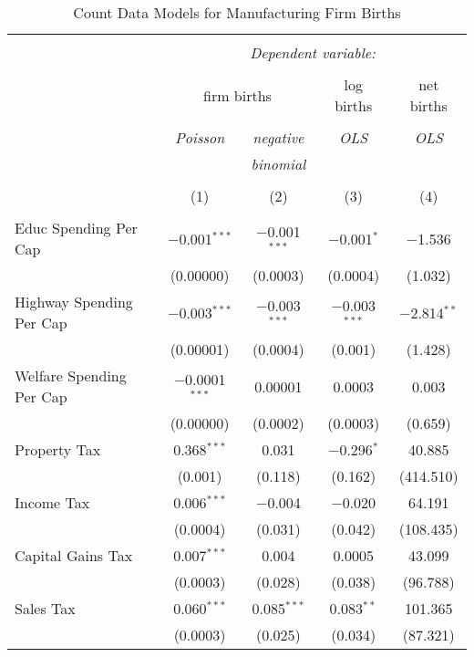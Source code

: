 
\begin{table}[!htbp] \centering 
  \caption{Count Data Models for Manufacturing Firm Births} 
  \label{} 
\begin{tabular}{@{\extracolsep{5pt}}lcccc} 
\\[-1.8ex]\hline 
\hline \\[-1.8ex] 
 & \multicolumn{4}{c}{\textit{Dependent variable:}} \\ 
\cline{2-5} 
\\[-1.8ex] & \multicolumn{2}{c}{firm births} & log births & net births \\ 
\\[-1.8ex] & \textit{Poisson} & \textit{negative} & \textit{OLS} & \textit{OLS} \\ 
 & \textit{} & \textit{binomial} & \textit{} & \textit{} \\ 
\\[-1.8ex] & (1) & (2) & (3) & (4)\\ 
\hline \\[-1.8ex] 
 Educ Spending Per Cap & $-$0.001$^{***}$ & $-$0.001$^{***}$ & $-$0.001$^{*}$ & $-$1.536 \\ 
  & (0.00000) & (0.0003) & (0.0004) & (1.032) \\ 
  Highway Spending Per Cap  & $-$0.003$^{***}$ & $-$0.003$^{***}$ & $-$0.003$^{***}$ & $-$2.814$^{**}$ \\ 
  & (0.00001) & (0.0004) & (0.001) & (1.428) \\ 
  Welfare Spending Per Cap  & $-$0.0001$^{***}$ & 0.00001 & 0.0003 & 0.003 \\ 
  & (0.00000) & (0.0002) & (0.0003) & (0.659) \\ 
  Property Tax & 0.368$^{***}$ & 0.031 & $-$0.296$^{*}$ & 40.885 \\ 
  & (0.001) & (0.118) & (0.162) & (414.510) \\ 
  Income Tax & 0.006$^{***}$ & $-$0.004 & $-$0.020 & 64.191 \\ 
  & (0.0004) & (0.031) & (0.042) & (108.435) \\ 
  Capital Gains Tax & 0.007$^{***}$ & 0.004 & 0.0005 & 43.099 \\ 
  & (0.0003) & (0.028) & (0.038) & (96.788) \\ 
  Sales Tax & 0.060$^{***}$ & 0.085$^{***}$ & 0.083$^{**}$ & 101.365 \\ 
  & (0.0003) & (0.025) & (0.034) & (87.321) \\ 

\end{tabular}
\end{table}
